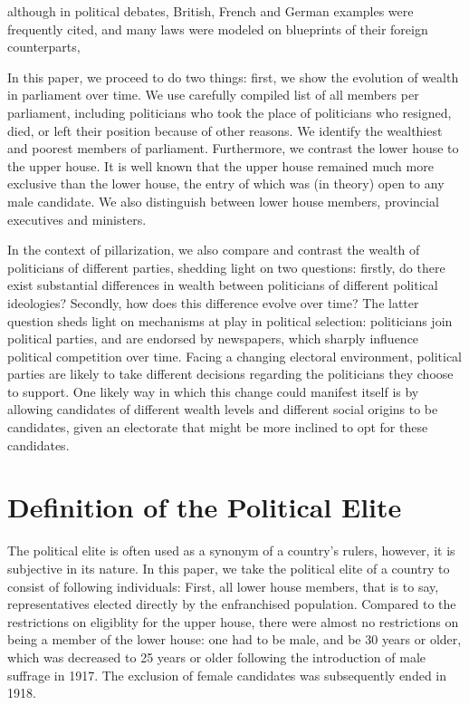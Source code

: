 although in political debates, British, French and German examples were frequently cited, and many laws were modeled on blueprints of their foreign counterparts, 


In this paper, we proceed to do two things: first, we show the evolution of wealth in parliament over time. We use carefully compiled list of all members per parliament, including politicians who took the place of politicians who resigned, died, or left their position because of other reasons. We identify the wealthiest and poorest members of parliament. Furthermore, we contrast the lower house to the upper house. It is well known that the upper house remained much more exclusive than the lower house, the entry of which was (in theory) open to any male candidate. We also distinguish between lower house members, provincial executives and ministers. 

In the context of pillarization, we also compare and contrast the wealth of politicians of different parties, shedding light on two questions: firstly, do there exist substantial differences in wealth between politicians of different political ideologies? Secondly, how does this difference evolve over time? The latter question sheds light on mechanisms at play in political selection: politicians join political parties, and are endorsed by newspapers, which sharply influence political competition over time. Facing a changing electoral environment, political parties are likely to take different decisions regarding the politicians they choose to support. One likely way in which this change could manifest itself is by allowing candidates of different wealth levels and different social origins to be candidates, given an electorate that might be more inclined to opt for these candidates. 

\section{Definition of the Political Elite}
The political elite is often used as a synonym of a country's rulers, however, it is subjective in its nature. In this paper, we take the political elite of a country to consist of following individuals: First, all lower house members, that is to say, representatives elected directly by the enfranchised population. Compared to the restrictions on eligiblity for the upper house, there were almost no restrictions on being a member of the lower house: one had to be male, and be 30 years or older, which was decreased to 25 years or older following the introduction of male suffrage in 1917. The exclusion of female candidates was subsequently ended in 1918. 

